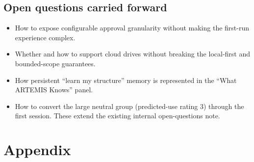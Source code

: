 \documentclass[11pt]{article}
\begin{document}
\subsection{Open questions carried forward}
\begin{itemize}
  \item How to expose configurable approval granularity without making the first-run experience
        complex.
  \item Whether and how to support cloud drives without breaking the local-first and
        bounded-scope guarantees.
  \item How persistent \enquote{learn my structure} memory is represented in the
        \enquote{What ARTEMIS Knows} panel.
  \item How to convert the large neutral group (predicted-use rating 3) through the first
        session. These extend the existing internal open-questions note.
\end{itemize}

\appendix
\clearpage
\section{Appendix}
\end{document}
